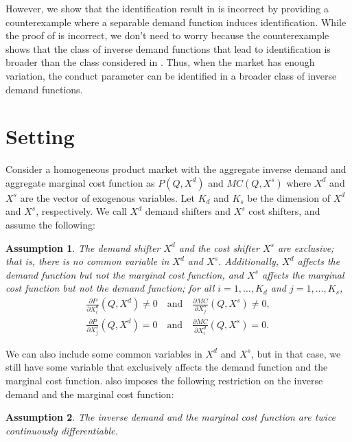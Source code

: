 \documentclass[11pt, a4paper]{article}
\newtheorem{assumption}{Assumption}
\theoremstyle{remark}
\begin{document}
However, we show that the identification result in \citet{lau1982identifying} is incorrect by providing a counterexample where a separable demand function induces identification.
While the proof of \citet{lau1982identifying} is incorrect, we don't need to worry because the counterexample shows that the class of inverse demand functions that lead to identification is broader than the class considered in \citet{lau1982identifying}.
Thus, when the market has enough variation, the conduct parameter can be identified in a broader class of inverse demand functions.


\section{Setting}\label{sec:setting}
Consider a homogeneous product market with the aggregate inverse demand and aggregate marginal cost function as $P(Q, X^{d})$ and $MC(Q, X^{s})$ where $X^{d}$ and $X^{s}$ are the vector of exogenous variables.
Let $K_d$ and $K_s$ be the dimension of $X^{d}$ and $X^{s}$, respectively.
We call $X^{d}$ demand shifters and $X^{s}$ cost shifters, and assume the following:
\begin{assumption}\label{assumption:exclusive_shifters}
    The demand shifter $X^{d}$ and the cost shifter $X^{s}$ are exclusive; that is, there is no common variable in $X^{d}$ and $X^{s}$.
    Additionally, $X^{d}$ affects the demand function but not the marginal cost function, and $X^{s}$ affects the marginal cost function but not the demand function; for all $i = 1, \ldots, K_d$ and $j = 1, \ldots, K_s$,
    \begin{align}
        \frac{\partial P}{\partial X^{d}_{i}}(Q, X^{d}) \ne 0 \quad \text{and} \quad \frac{\partial MC}{\partial X^{s}_{j}}(Q, X^{s}) \ne 0,\\
        \frac{\partial P}{\partial X^{s}_{j}}(Q, X^{d}) = 0 \quad \text{and} \quad \frac{\partial MC}{\partial X^{d}_{i}}(Q, X^{s}) = 0.
    \end{align}
\end{assumption}
We can also include some common variables in $X^{d}$ and $X^{s}$, but in that case, we still have some variable that exclusively affects the demand function and the marginal cost function.
\citet{lau1982identifying} also imposes the following restriction on the inverse demand and the marginal cost function:
\begin{assumption}\label{assumption:twice_differentiable}
    The inverse demand and the marginal cost function are twice continuously differentiable.
\end{assumption}
\end{document}
